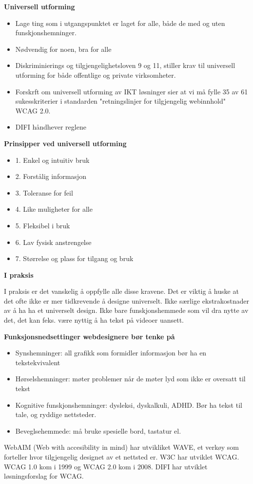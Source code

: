 \documentclass{article}
\begin{document}
\begin{flushleft}
    

\textbf{Universell utforming}
\begin{itemize}
    \item Lage ting som i utgangspunktet er laget for alle, både de med og uten funskjonshemninger.
    \item Nødvendig for noen, bra for alle
    \item Diskriminierings og tilgjengelighetsloven 9 og 11, stiller krav til universell utforming for både offentlige og private virksomheter. 
    \item Forskrft om universell utforming av IKT løsninger sier at vi må fylle 35 av 61 sukesskriterier i standarden "retningslinjer for tilgjengelig webinnhold" WCAG 2.0.
    \item DIFI håndhever reglene
\end{itemize}

\textbf{Prinsipper ved universell utforming}

\begin{itemize}
    \item 1. Enkel og intuitiv bruk
    \item 2. Forstålig informasjon 
    \item 3. Toleranse for feil
    \item 4. Like muligheter for alle 
    \item 5. Fleksibel i bruk
    \item 6. Lav fysisk anstrengelse
    \item 7. Størrelse og plass for tilgang og bruk 

\end{itemize}

\textbf{I praksis} \par
I praksis er det vanskelig å oppfylle alle disse kravene. 
Det er viktig å huske at det ofte ikke er mer tidkrevende å designe universelt. 
Ikke særlige ekstrakostnader av å ha ha et universelt design.
Ikke bare funskjonshemmede som vil dra nytte av det, det kan feks. være nyttig å ha tekst på videoer uansett.
\par
\textbf{Funksjonsnedsettinger webdesignere bør tenke på}

\begin{itemize}
    \item Synshemninger: all grafikk som formidler informasjon bør ha en tekstekvivalent
    \item Hørselshemninger: møter problemer når de møter lyd som ikke er oversatt til tekst
    \item Kognitive funskjonshemninger: dysleksi, dyskalkuli, ADHD. Bør ha tekst til tale, og ryddige nettsteder.
    \item Beveglsehemmede: må bruke spesielle bord, tastatur el.
\end{itemize}

WebAIM (Web with accesibility in mind) har utvikliket WAVE, et verkøy som forteller hvor tilgjengelig designet av et nettsted er.
\bigskip
W3C har utviklet WCAG. WCAG 1.0 kom i 1999 og WCAG 2.0 kom i 2008. DIFI har utviklet løsningsforslag for WCAG. 


\end{flushleft}
\end{document}

